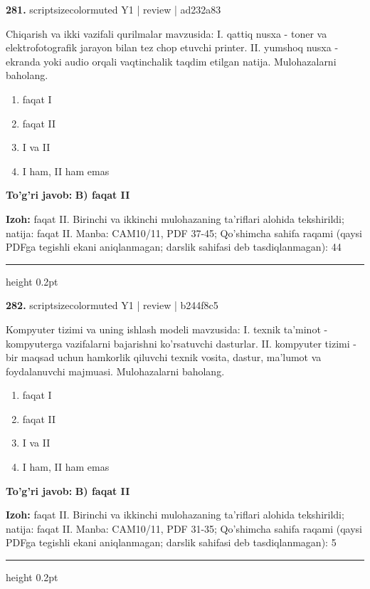 \documentclass[10pt,a4paper]{article}
\begin{document}
{\bfseries\sffamily\color{ink} 281.} {scriptsizecolor{muted} Y1 | review | ad232a83}
\par
Chiqarish va ikki vazifali qurilmalar mavzusida: I. qattiq nusxa - toner va elektrofotografik jarayon bilan tez chop etuvchi printer. II. yumshoq nusxa - ekranda yoki audio orqali vaqtinchalik taqdim etilgan natija. Mulohazalarni baholang.
\begin{enumerate}[label=\Alph*),leftmargin=9mm]
\item faqat I
\item faqat II
\item I va II
\item I ham, II ham emas
\end{enumerate}
\begin{tcolorbox}[enhanced,breakable,colback=teal!4,colframe=teal!60!black,boxrule=0.45pt,arc=1.2mm,left=2.7mm,right=2.7mm,top=1.8mm,bottom=1.8mm,before skip=2mm,after skip=2mm]
{\bfseries\sffamily\color{teal}To'g'ri javob:} \textbf{B) faqat II}
\par\smallskip
{\bfseries Izoh:} faqat II. Birinchi va ikkinchi mulohazaning ta'riflari alohida tekshirildi; natija: faqat II. Manba: CAM10/11, PDF 37-45; Qo'shimcha sahifa raqami (qaysi PDFga tegishli ekani aniqlanmagan; darslik sahifasi deb tasdiqlanmagan): 44
\end{tcolorbox}
\vspace{2mm}\hrule height 0.2pt\vspace{3mm}

{\bfseries\sffamily\color{ink} 282.} {scriptsizecolor{muted} Y1 | review | b244f8c5}
\par
Kompyuter tizimi va uning ishlash modeli mavzusida: I. texnik ta'minot - kompyuterga vazifalarni bajarishni ko'rsatuvchi dasturlar. II. kompyuter tizimi - bir maqsad uchun hamkorlik qiluvchi texnik vosita, dastur, ma'lumot va foydalanuvchi majmuasi. Mulohazalarni baholang.
\begin{enumerate}[label=\Alph*),leftmargin=9mm]
\item faqat I
\item faqat II
\item I va II
\item I ham, II ham emas
\end{enumerate}
\begin{tcolorbox}[enhanced,breakable,colback=teal!4,colframe=teal!60!black,boxrule=0.45pt,arc=1.2mm,left=2.7mm,right=2.7mm,top=1.8mm,bottom=1.8mm,before skip=2mm,after skip=2mm]
{\bfseries\sffamily\color{teal}To'g'ri javob:} \textbf{B) faqat II}
\par\smallskip
{\bfseries Izoh:} faqat II. Birinchi va ikkinchi mulohazaning ta'riflari alohida tekshirildi; natija: faqat II. Manba: CAM10/11, PDF 31-35; Qo'shimcha sahifa raqami (qaysi PDFga tegishli ekani aniqlanmagan; darslik sahifasi deb tasdiqlanmagan): 5
\end{tcolorbox}
\vspace{2mm}\hrule height 0.2pt\vspace{3mm}
\end{document}
